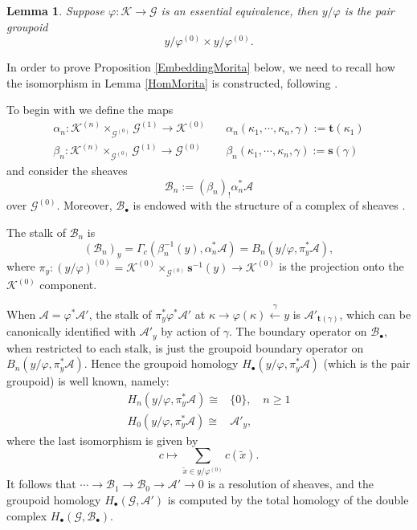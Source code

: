 \documentclass[a4paper]{amsart}
\newcommand{\maA}{\mathcal A}
\newcommand{\maB}{\mathcal B}
\newcommand{\maG}{\mathcal G}
\newcommand{\maK}{\mathcal K}
\newcommand{\bs}{\mathbf{s}}
\newcommand{\bt}{\mathbf{t}}
\newcommand\<{\langle}
\renewcommand\>{\rangle}
\newtheorem{lem}[theorem]{Lemma}
\theoremstyle{definition}
\theoremstyle{remark}
\begin{document}
\begin{lem}
Suppose $\varphi : \maK \to \maG$ is an essential equivalence, then $y / \varphi$ is the pair groupoid
$$ y / \varphi ^{(0)} \times y / \varphi ^{(0)}.$$
\end{lem}


In order to prove Proposition \ref{EmbeddingMorita} below,
we need to recall how the isomorphism in Lemma \ref{HomMorita} is constructed, following \cite[Section 4.2]{Moerdijk;EtaleHomology}.

To begin with we define the maps
\begin{align*}
\alpha _n : \maK ^{(n)} \times _{\maG ^{(0)}} \maG ^{(1)} \to \maK ^{(0)}
& \quad \alpha_n (\kappa_1, \cdots , \kappa_n, \gamma ) := \bt (\kappa _1) \\
\beta _n : \maK ^{(n)} \times _{\maG ^{(0)}} \maG ^{(1)} \to \maG ^{(0)}
& \quad \beta _n (\kappa_1, \cdots , \kappa_n, \gamma ) := \bs (\gamma)
\end{align*}
and consider the sheaves
$$ \maB _n := (\beta _n)_! \alpha _n^* \maA $$
over $\maG ^{(0)}$.
Moreover, $\maB _\bullet$ is endowed with the structure of a complex of sheaves \cite[p.35]{Moerdijk;EtaleHomology}.

The stalk of $\maB _n$ is
$$ (\maB _n )_y = \Gamma _c (\beta _n^{-1} (y), \alpha _n ^* \maA) = B _n (y / \varphi , \pi _y^* \maA ) ,$$
where $\pi _y : (y / \varphi )^{(0)} = \maK ^{(0)} \times _{\maG ^{(0)}} \bs ^{-1} (y) \to \maK ^{(0)}$
is the projection onto the $\maK ^{(0)}$ component.

When $\maA = \varphi ^* \maA'$,
the stalk of $\pi_y ^* \varphi ^* \maA'$ at $\kappa \to \varphi (\kappa) \xleftarrow{\gamma} y $ is $\maA' _{\bt (\gamma)}$,
which can be canonically identified with $\maA' _y$ by action of $\gamma$.
The boundary operator on $\maB _\bullet$, when restricted to each stalk,
is just the groupoid boundary operator on $B _n (y / \varphi , \pi _y^* \maA )$.
Hence the groupoid homology $H _\bullet (y / \varphi , \pi _y^* \maA )$ (which is the pair groupoid) is well known, namely:
\begin{align*}
H _n (y / \varphi , \pi _y^* \maA ) \cong & \{ 0 \}, \quad n \geq 1 \\
H _0 (y / \varphi , \pi _y^* \maA ) \cong & \maA' _y,
\end{align*}
where the last isomorphism is given by
$$ c \mapsto \sum _{\tilde x \in y / \varphi ^{(0)}} c (\tilde x) .$$
It follows that $\cdots \to \maB _1 \to \maB _0 \to \maA' \to 0$ is a resolution of sheaves,
and the groupoid homology
$H _\bullet (\maG , \maA') $ is computed by the total homology of the double complex $H _\bullet (\maG , \maB _\bullet) $.
\end{document}

